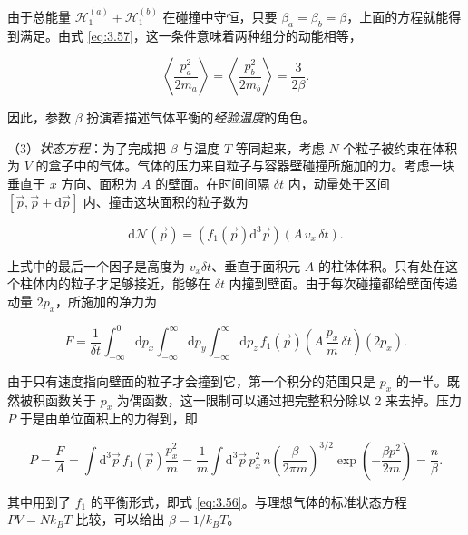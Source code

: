 由于总能量 $\mathcal H_1^{(a)}+\mathcal H_1^{(b)}$ 在碰撞中守恒，只要 $\beta_a=\beta_b=\beta$，上面的方程就能得到满足。由式 \eqref{eq:3.57}，这一条件意味着两种组分的动能相等，

\begin{equation}\label{eq:3.61}
  \left\langle\frac{p_a^2}{2m_a}\right\rangle=\left\langle\frac{p_b^2}{2m_b}\right\rangle=\frac{3}{2\beta}.
\end{equation}

因此，参数 $\beta$ 扮演着描述气体平衡的\emph{经验温度}的角色。


（3）\emph{状态方程}：为了完成把 $\beta$ 与温度 $T$ 等同起来，考虑 $N$ 个粒子被约束在体积为 $V$ 的盒子中的气体。气体的压力来自粒子与容器壁碰撞所施加的力。考虑一块垂直于 $x$ 方向、面积为 $A$ 的壁面。在时间间隔 $\delta t$ 内，动量处于区间 $[\vec p,\vec p+\mathrm{d}\vec p]$ 内、撞击这块面积的粒子数为

\begin{equation}\label{eq:3.62}
  \mathrm{d}\mathcal N(\vec p)=\left(f_1(\vec p)\mathrm{d}^3\vec p\right)\left(A\,v_x\,\delta t\right).
\end{equation}

上式中的最后一个因子是高度为 $v_x\delta t$、垂直于面积元 $A$ 的柱体体积。只有处在这个柱体内的粒子才足够接近，能够在 $\delta t$ 内撞到壁面。由于每次碰撞都给壁面传递动量 $2p_x$，所施加的净力为

\begin{equation}\label{eq:3.63}
  F=\frac{1}{\delta t}\int_{-\infty}^{0}\mathrm{d}p_x\int_{-\infty}^{\infty}\mathrm{d}p_y\int_{-\infty}^{\infty}\mathrm{d}p_z\,f_1(\vec p)\left(A\,\frac{p_x}{m}\,\delta t\right)\left(2p_x\right).
\end{equation}

由于只有速度指向壁面的粒子才会撞到它，第一个积分的范围只是 $p_x$ 的一半。既然被积函数关于 $p_x$ 为偶函数，这一限制可以通过把完整积分除以 2 来去掉。压力 $P$ 于是由单位面积上的力得到，即

\begin{equation}\label{eq:3.64}
  P=\frac{F}{A}=\int \mathrm{d}^3\vec p\,f_1(\vec p)\frac{p_x^2}{m}=\frac{1}{m}\int \mathrm{d}^3\vec p\,p_x^2\,n\left(\frac{\beta}{2\pi m}\right)^{3/2}\exp\left(-\frac{\beta p^2}{2m}\right)=\frac{n}{\beta}.
\end{equation}

其中用到了 $f_1$ 的平衡形式，即式 \eqref{eq:3.56}。与理想气体的标准状态方程 $PV=Nk_BT$ 比较，可以给出 $\beta=1/k_BT$。


